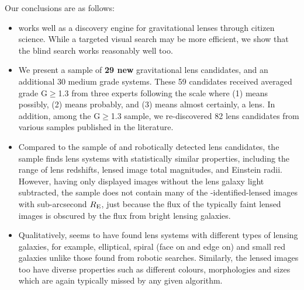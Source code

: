 \documentclass[useAMS,usenatbib,a4paper]{mn2e}
\begin{document}
Our conclusions are as follows:
\begin{itemize}
\item \sw works well as a discovery engine for gravitational lenses
through citizen science. While a targeted visual search may be more
efficient, we show that the blind search works reasonably well too.


\item We present a sample of {\bf 29 new} gravitational lens candidates,
and an additional 30 medium grade systems. These 59 candidates received
averaged grade G$\ge$1.3 from three experts following the scale
where (1) means possibly, (2) means
probably, and (3) means almost certainly, a lens. In addition, among the
G$\ge$1.3 sample, we re-discovered 82 lens candidates from various samples
published in the literature.

\item Compared to the sample of \rf and \af robotically detected
lens candidates, the \sw sample finds lens systems with statistically similar properties,
including the range of
lens redshifts, lensed image total
magnitudes, and Einstein radii. However, having only displayed images without
the lens galaxy light subtracted, the \sw sample does not contain
many of the \rf-identified-lensed images with
sub-arcsecond $R_{\rm E}$, just because the flux of the typically faint
lensed images is obscured by the flux from bright lensing galaxies.

\item Qualitatively, \sw seems to have found lens systems with different
types of lensing galaxies, for example, elliptical, spiral (face on and
edge on) and small red galaxies unlike those found from robotic
searches. Similarly, the lensed images too have diverse properties such
as different colours, morphologies and sizes which are again typically
missed by any given algorithm.



\end{itemize}
\end{document}
